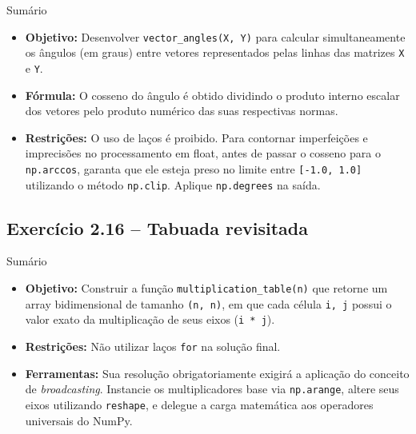 \documentclass[11pt,a4paper]{article}
\begin{document}
\begin{exercicio}{Sumário}
\begin{itemize}
    \item \textbf{Objetivo:} Desenvolver \texttt{vector\_angles(X, Y)} para calcular simultaneamente os ângulos (em graus) entre vetores representados pelas linhas das matrizes \texttt{X} e \texttt{Y}.
    \item \textbf{Fórmula:} O cosseno do ângulo é obtido dividindo o produto interno escalar dos vetores pelo produto numérico das suas respectivas normas.
    \item \textbf{Restrições:} O uso de laços é proibido. Para contornar imperfeições e imprecisões no processamento em float, antes de passar o cosseno para o \texttt{np.arccos}, garanta que ele esteja preso no limite entre \texttt{[-1.0, 1.0]} utilizando o método \texttt{np.clip}. Aplique \texttt{np.degrees} na saída.
\end{itemize}
\end{exercicio}

\subsection*{Exercício 2.16 -- Tabuada revisitada}

\begin{exercicio}{Sumário}
\begin{itemize}
    \item \textbf{Objetivo:} Construir a função \texttt{multiplication\_table(n)} que retorne um array bidimensional de tamanho \texttt{(n, n)}, em que cada célula \texttt{i, j} possui o valor exato da multiplicação de seus eixos (\texttt{i * j}).
    \item \textbf{Restrições:} Não utilizar laços \texttt{for} na solução final.
    \item \textbf{Ferramentas:} Sua resolução obrigatoriamente exigirá a aplicação do conceito de \textit{broadcasting}. Instancie os multiplicadores base via \texttt{np.arange}, altere seus eixos utilizando \texttt{reshape}, e delegue a carga matemática aos operadores universais do NumPy.
\end{itemize}
\end{exercicio}
\end{document}

